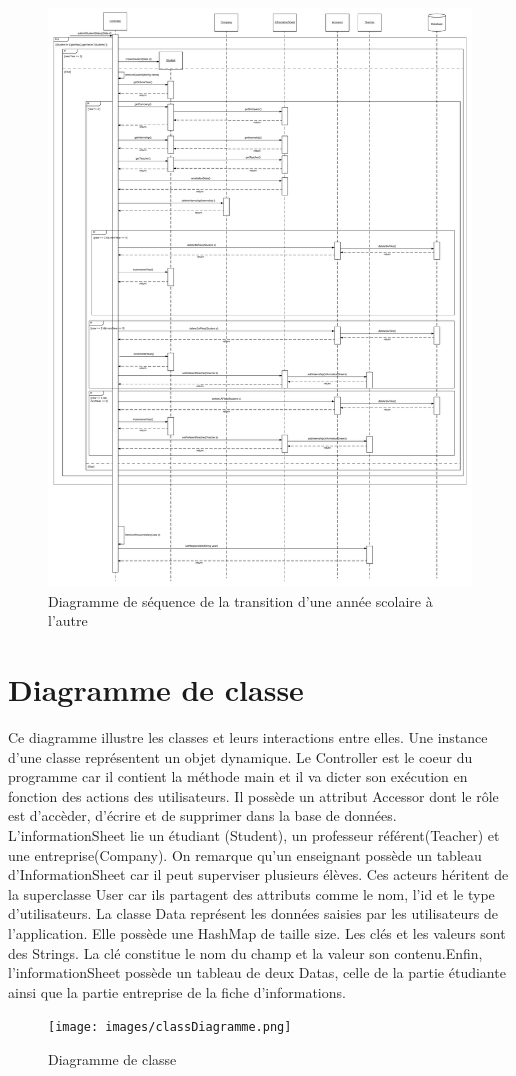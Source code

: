 \documentclass{scrreprt}
\begin{document}
\newpage
\begin{figure}[h]
\centering
\includegraphics[width=15cm]{images/newYearSeqDiag.png}
\caption{Diagramme de séquence de la transition d'une année scolaire à l'autre}
\end{figure}

\newpage
\chapter{Diagramme de classe}

Ce diagramme illustre les classes et leurs interactions entre elles. Une instance d'une classe représentent un objet dynamique. Le Controller est le coeur du programme car il contient la méthode main et il va dicter son exécution en fonction des actions des utilisateurs. Il possède un attribut Accessor dont le rôle est d'accèder, d'écrire et de supprimer dans la base de données. L'informationSheet lie un étudiant (Student), un professeur référent(Teacher) et une entreprise(Company). On remarque qu'un enseignant possède un tableau d'InformationSheet car il peut superviser plusieurs élèves. Ces acteurs héritent de la superclasse User car ils partagent des attributs comme le nom, l'id et le type d'utilisateurs. La classe Data représent les données saisies par les utilisateurs de l'application. Elle possède une HashMap de taille size. Les clés et les valeurs sont des Strings. La clé constitue le nom du champ et la valeur son contenu.Enfin, l'informationSheet possède un tableau de deux Datas, celle de la partie étudiante ainsi que la partie entreprise de la fiche d'informations.

\begin{figure}[!h]
\centering
\texttt{[image: images/classDiagramme.png]}
\caption{Diagramme de classe}
\end{figure}
\end{document}
